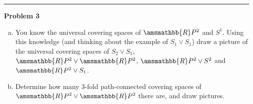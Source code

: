 \documentclass[a4paper, 12pt]{article}
\newenvironment{problem}[2][Problem]
    { \begin{mdframed}[backgroundcolor=gray!20] \textbf{#1 #2} \\}
    {  \end{mdframed}}
\renewcommand{\mathbb}{\amsmathbb}
\begin{document}
\noindent\rule{7in}{2.8pt}
\begin{problem}{3}
\begin{enumerate}[(a)]
\item You know the universal covering spaces of \(\mathbb{R}P^2\) and \(S^1\). Using this knowledge (and thinking about the example of \(S_1\vee S_1\)) draw a picture of the universal covering spaces of 
\(S_2\vee S_1\), \(\mathbb{R}P^2\vee \mathbb{R}P^2\), \(\mathbb{R}P^2\vee S^2\) and \(\mathbb{R}P^2\vee S_1\). 
\item Determine how many 3-fold path-connected covering spaces of \(\mathbb{R}P^2\vee \mathbb{R}P^2\) there are, and draw pictures.
\end{enumerate}
\end{problem}
\end{document}
